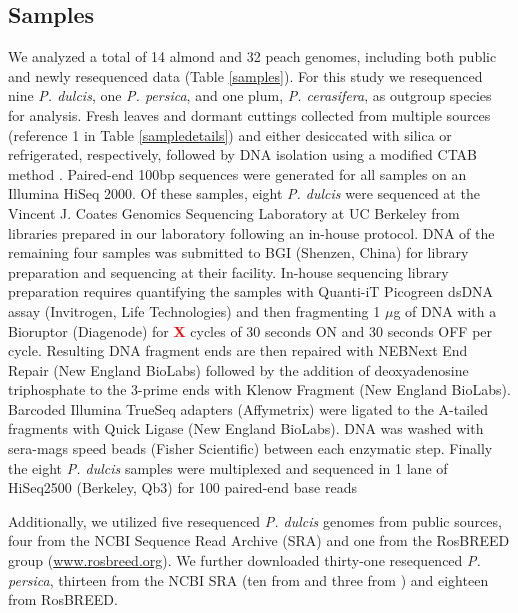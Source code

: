 \documentclass[12pt]{article}
\newcommand{\X}{\textcolor{red}{\bf X }}
\newcommand{\jri}[1]{\textcolor{red}{\emph{#1}}}
\newcommand{\dv}[1]{\textcolor{blue}{\emph{#1}}}
\begin{document}
\subsection*{Samples}
We analyzed a total of 14 almond and 32 peach genomes, including both public and newly resequenced data (Table \ref{samples}). 
%
For this study we resequenced nine \emph{P. dulcis}, one \emph{P. persica}, and one plum, \emph{P. cerasifera}, as outgroup species for analysis.
%
Fresh leaves and dormant cuttings collected from multiple sources (reference 1 in Table \ref{sampledetails}) and either desiccated with silica or refrigerated, respectively, followed by DNA isolation using a modified CTAB method \citep{doyle1987rapid}.
%
Paired-end 100bp sequences were generated for all samples on an Illumina HiSeq 2000. 
%
Of these samples, eight \emph{P. dulcis} were sequenced at the Vincent J. Coates Genomics Sequencing Laboratory at UC Berkeley from libraries prepared in our laboratory following an in-house protocol. 
DNA of the remaining four samples was submitted to BGI (Shenzen, China) for library preparation and sequencing at their facility.
%
In-house sequencing library preparation requires quantifying the samples with Quanti-iT Picogreen dsDNA assay (Invitrogen, Life Technologies) and then fragmenting 1 $\mu$g of DNA with a Bioruptor (Diagenode) for \X cycles of 30 seconds ON and 30 seconds OFF per cycle. 
%
Resulting DNA fragment ends are then repaired with NEBNext End Repair (New England BioLabs) followed by the addition of deoxyadenosine triphosphate to the 3-prime ends with Klenow Fragment (New England BioLabs). 
%
Barcoded Illumina TrueSeq adapters (Affymetrix) were ligated to the A-tailed fragments with Quick Ligase (New England BioLabs). 
%
DNA was washed with sera-mags speed beads (Fisher Scientific) between each enzymatic step.  
%
%
Finally the eight \emph{P. dulcis} samples were multiplexed and sequenced in 1 lane of HiSeq2500 (Berkeley, Qb3) for 100 paired-end base reads

Additionally, we utilized five resequenced \emph{P. dulcis} genomes from public sources, four from \citealt{koepke2013comparative} %
the NCBI Sequence Read Archive (SRA) and one from the RosBREED group (\url{www.rosbreed.org}). 
%
We further downloaded thirty-one resequenced \emph{P. persica}, thirteen from the NCBI SRA (ten from \citealp{verde2013high} and three from \citealp{ahmad2011whole}) and eighteen from RosBREED.
%
%
\end{document}
